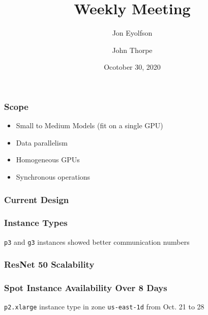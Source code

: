 

\title{Weekly Meeting}
\date{Ocotober 30, 2020}
\author{Jon Eyolfson \and John Thorpe}



  \begin{frame}[plain]
    \titlepage
  \end{frame}

  \setcounter{framenumber}{0}

  \begin{frame}
    \frametitle{Scope}

    \begin{itemize}
      \item Small to Medium Models (fit on a single GPU)
      \item Data parallelism
      \item Homogeneous GPUs
      \item Synchronous operations
    \end{itemize}
  \end{frame}

  \begin{frame}
    \frametitle{Current Design}
  \end{frame}

  \begin{frame}
    \frametitle{Instance Types}

    \texttt{p3} and \texttt{g3} instances showed better communication numbers

  \end{frame}

  \begin{frame}
    \frametitle{ResNet 50 Scalability}

  \end{frame}

  \begin{frame}
    \frametitle{Spot Instance Availability Over 8 Days}

    \begin{center}
      
    \end{center}

    \texttt{p2.xlarge} instance type in zone \texttt{us-east-1d} from
    Oct. 21 to 28
  \end{frame}

